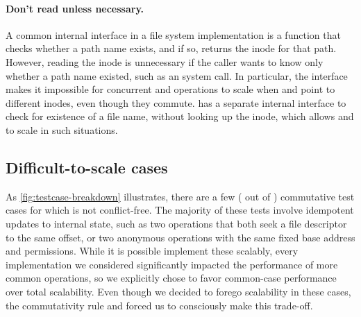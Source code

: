 \paragraph{Don't read unless necessary.}  A common internal interface
in a file system implementation is a  function that
checks whether a path name exists, and if so, returns the inode for
that path.
%
However, reading the inode is unnecessary
if the caller wants to know only whether a path name existed, such as
an  system call.  In particular, the 
interface makes it impossible for concurrent 
and  operations to scale when  and 
point to different inodes, even though they commute.
\fs has a separate internal interface to check for existence of a
file name, without looking up the inode, which allows 
and  to scale in such situations.


\subsection{Difficult-to-scale cases}

As \cref{fig:testcase-breakdown} illustrates, there are a few
( out of )
commutative test cases for
which \fs is not conflict-free.
%
The majority of these tests involve idempotent updates to internal
state, such as two  operations that both seek a file
descriptor to the same offset, or two anonymous  operations
with the same fixed base address and permissions.  While it is
possible implement these scalably, every implementation we considered
significantly impacted the performance of more common operations, so
we explicitly chose to favor common-case performance over total
scalability.  Even though we decided to forego scalability in these
cases, the commutativity rule and \tool forced us to consciously make
this trade-off.
%


